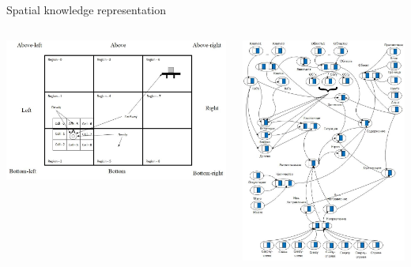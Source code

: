 \documentclass[default]{beamer}
\begin{document}
		\begin{frame}{Spatial knowledge representation}
			
			\begin{columns}
				\begin{column}{0.55\textwidth}
					\includegraphics[width=\textwidth]{examples/representations/spatial_swm.jpg}
				\end{column}
				\begin{column}{0.45\textwidth}
					\includegraphics[width=\textwidth]{examples/representations/areas_signif.jpg}
				\end{column}
			\end{columns}
		\end{frame}
\end{document}
